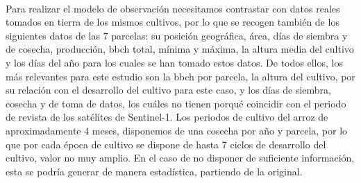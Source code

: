 \\
\par Para realizar el modelo de observación necesitamos contrastar con datos reales tomados en tierra de los mismos cultivos, por lo que se recogen también de los siguientes datos de las 7 parcelas: su posición geográfica, área, días de siembra y de cosecha, producción, \gls{bbch} total, mínima y máxima, la altura media del cultivo y los días del año para los cuales se han tomado estos datos. De todos ellos, los más relevantes para este estudio son la \gls{bbch} por parcela, la altura del cultivo, por su relación con el desarrollo del cultivo para este caso, y los días de siembra, cosecha y de toma de datos, los cuáles no tienen porqué coincidir con el periodo de revista de los satélites de Sentinel-1.  Los periodos de cultivo del arroz de aproximadamente 4 meses, disponemos de una cosecha por año y parcela, por lo que por cada época de cultivo se dispone de hasta 7 ciclos de desarrollo del cultivo, valor no muy amplio. En el caso de no disponer de suficiente información, esta se podría generar de manera estadística, partiendo de la original. 

